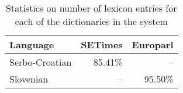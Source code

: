 \begin{table}
\begin{tabular}{lrr}

\textbf{Language} & \textbf{SETimes} & \textbf{Europarl}\\
\hline
Serbo-Croatian & 85.41\% & -- \\
Slovenian &  -- & 95.50\%\\
\hline
\end{tabular}
\caption{ Statistics on number of lexicon entries for each of the
dictionaries in the system }
\label{table:coverage}
\end{table}

